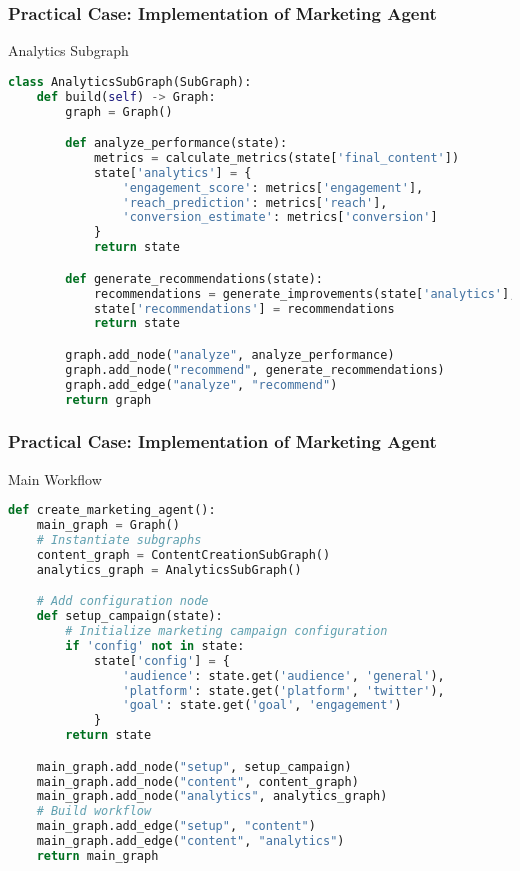 \begin{frame}[fragile]\frametitle{Practical Case: Implementation of Marketing Agent}

Analytics Subgraph

\begin{lstlisting}[language=Python, basicstyle=\tiny]
class AnalyticsSubGraph(SubGraph):
    def build(self) -> Graph:
        graph = Graph()

        def analyze_performance(state):
            metrics = calculate_metrics(state['final_content'])
            state['analytics'] = {
                'engagement_score': metrics['engagement'],
                'reach_prediction': metrics['reach'],
                'conversion_estimate': metrics['conversion']
            }
            return state

        def generate_recommendations(state):
            recommendations = generate_improvements(state['analytics'], state['goal'])
            state['recommendations'] = recommendations
            return state

        graph.add_node("analyze", analyze_performance)
        graph.add_node("recommend", generate_recommendations)
        graph.add_edge("analyze", "recommend")
        return graph
\end{lstlisting}
\end{frame}

\begin{frame}[fragile]\frametitle{Practical Case: Implementation of Marketing Agent}

Main Workflow

\begin{lstlisting}[language=Python, basicstyle=\tiny]
def create_marketing_agent():
    main_graph = Graph()
    # Instantiate subgraphs
    content_graph = ContentCreationSubGraph()
    analytics_graph = AnalyticsSubGraph()

    # Add configuration node
    def setup_campaign(state):
        # Initialize marketing campaign configuration
        if 'config' not in state:
            state['config'] = {
                'audience': state.get('audience', 'general'),
                'platform': state.get('platform', 'twitter'),
                'goal': state.get('goal', 'engagement')
            }
        return state

    main_graph.add_node("setup", setup_campaign)
    main_graph.add_node("content", content_graph)
    main_graph.add_node("analytics", analytics_graph)
    # Build workflow
    main_graph.add_edge("setup", "content")
    main_graph.add_edge("content", "analytics")
    return main_graph
\end{lstlisting}
\end{frame}

